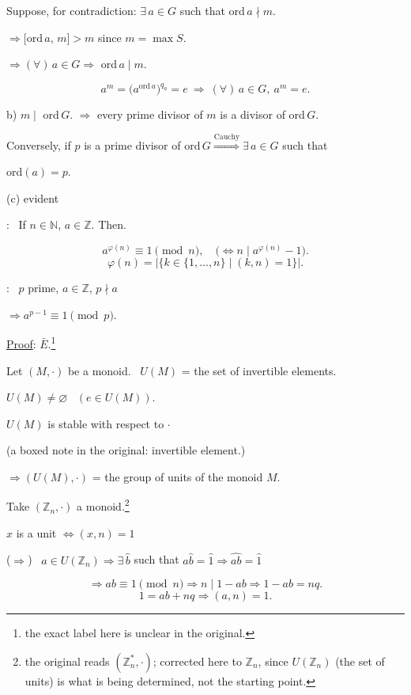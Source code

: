 \documentclass[12pt]{article}
\begin{document}
\noindent Suppose, for contradiction: $\exists\,a\in G$ such that ord$\,a\nmid m$.

\noindent $\Rightarrow \big[\text{ord}\,a,\,m\big] > m$ \quad since $m=\max S$.

\bigskip
\noindent $\Rightarrow (\forall)\,a\in G \Rightarrow$ ord$\,a\mid m$.

\[
a^m = \big(a^{\text{ord}\,a}\big)^{q_a} = e \ \Rightarrow \ (\forall)\,a\in G,\ a^m=e.
\]

\bigskip
\noindent b) $m\mid$ ord$\,G$. $\Rightarrow$ every prime divisor of $m$ is a divisor of ord$\,G$.

\noindent Conversely, if $p$ is a prime divisor of ord$\,G \overset{\text{Cauchy}}{\Longrightarrow} \exists\,a\in G$ such that

\noindent ord$(a)=p$.

\bigskip
\noindent (c) evident

\bigskip
\noindent{}: \ If $n\in\mathbb{N}$, $a\in\mathbb{Z}$. Then.

\[
a^{\varphi(n)} \equiv 1 \pmod n, \quad \big(\Leftrightarrow n\mid a^{\varphi(n)}-1\big).
\]
\[
\varphi(n) = \big|\{k\in\{1,\ldots,n\} \mid (k,n)=1\}\big|.
\]

\bigskip
\noindent{}: \ $p$ prime, $a\in\mathbb{Z}$, $p\nmid a$

\noindent $\Rightarrow a^{p-1}\equiv 1 \pmod p$.

\bigskip
\noindent\underline{Proof}: $\bar E$.\footnote{the exact label here is unclear in the original.}

\noindent Let $(M,\cdot)$ be a monoid. \ $U(M)$ = the set of invertible elements.

\bigskip
\noindent $U(M)\neq\varnothing$ \ $(e\in U(M))$.

\noindent $U(M)$ is stable with respect to $\cdot$

\noindent (a boxed note in the original: invertible element.)

\bigskip
\noindent $\Rightarrow (U(M),\cdot)$ = the group of units of the monoid $M$.

\bigskip
\noindent Take $(\mathbb{Z}_n,\cdot)$ a monoid.\footnote{the original reads $(\mathbb{Z}_n^*,\cdot)$; corrected here to $\mathbb{Z}_n$, since $U(\mathbb{Z}_n)$ (the set of units) is what is being determined, not the starting point.}

\bigskip
\noindent $\hat x$ is a unit $\Leftrightarrow (x,n)=1$

\bigskip
\noindent ($\Rightarrow$) \ $\hat a\in U(\mathbb{Z}_n) \Rightarrow \exists\,\hat b$ such that $\hat a\hat b=\hat 1 \Rightarrow \widehat{ab}=\hat 1$

\[
\Rightarrow ab\equiv 1 \pmod n \Rightarrow n\mid 1-ab \Rightarrow 1-ab=nq.
\]
\[
1=ab+nq \Rightarrow (a,n)=1.
\]
\end{document}

